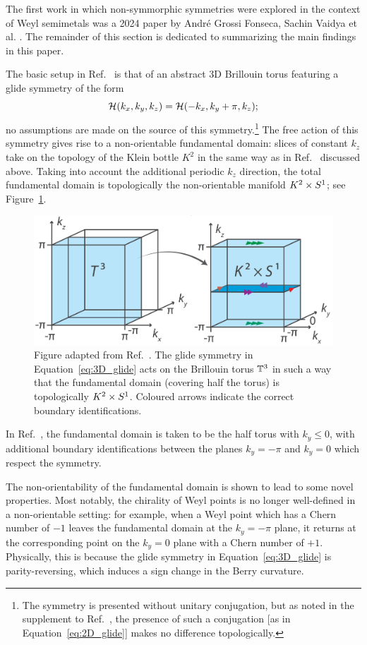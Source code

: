 The first work in which non-symmorphic symmetries were explored in the context of Weyl semimetals was a 2024 paper by André Grossi Fonseca, Sachin Vaidya et al. \cite{Fonseca-Vaidya_nonorientable}. The remainder of this section is dedicated to summarizing the main findings in this paper.

The basic setup in Ref.~\cite{Fonseca-Vaidya_nonorientable} is that of an abstract 3D Brillouin torus featuring a glide symmetry of the form
\begin{equation}\label{eq:3D_glide}
	\mathcal{H}(k_x, k_y, k_z) = \mathcal{H}(-k_x, k_y + \pi, k_z);
\end{equation}
no assumptions are made on the source of this symmetry.\footnote{
	The symmetry is presented without unitary conjugation, but as noted in the supplement to Ref.~\cite{Fonseca-Vaidya_nonorientable}, the presence of such a conjugation [as in Equation~\eqref{eq:2D_glide}] makes no difference topologically.}
The free action of this symmetry gives rise to a non-orientable fundamental domain: slices of constant $k_z$ take on the topology of the Klein bottle $K^2$ in the same way as in Ref.~\cite{CYZ_Klein-gauge} discussed above. Taking into account the additional periodic $k_z$ direction, the total fundamental domain is topologically the non-orientable manifold $K^2\times S^1$; see Figure~\ref{fig:K2S1}.
\begin{figure}[htb!]
	\centering
	\includegraphics[width=.7\linewidth]{Images/K2S1}
	\caption{Figure adapted from Ref.~\cite{Fonseca-Vaidya_nonorientable}. The glide symmetry in Equation~\eqref{eq:3D_glide} acts on the Brillouin torus $\mathbb{T}^3$ in such a way that the fundamental domain (covering half the torus) is topologically $K^2\times S^1$. Coloured arrows indicate the correct boundary identifications.}
	\label{fig:K2S1}
\end{figure}
In Ref.~\cite{Fonseca-Vaidya_nonorientable}, the fundamental domain is taken to be the half torus with $k_y\leq 0$, with additional boundary identifications between the planes $k_y=-\pi$ and $k_y=0$ which respect the symmetry.

The non-orientability of the fundamental domain is shown to lead to some novel properties. Most notably, the chirality of Weyl points is no longer well-defined in a non-orientable setting: for example, when a Weyl point which has a Chern number of $-1$ leaves the fundamental domain at the $k_y=-\pi$ plane, it returns at the corresponding point on the $k_y=0$ plane with a Chern number of $+1$. Physically, this is because the glide symmetry in Equation~\eqref{eq:3D_glide} is parity-reversing, which induces a sign change in the Berry curvature.


